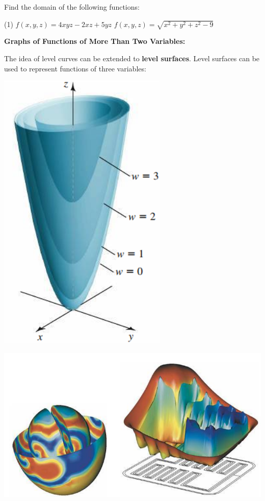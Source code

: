 \documentclass[../mathNotesPreamble]{subfiles}
\begin{document}
  \begin{ex*}
    Find the domain of the following functions:
  \end{ex*}
  \begin{tasks}[after-item-skip=\stretch{1}, label=](1)
    \task $f(x,y,z)=4xyz-2xz+5yz$
    \task $f(x,y,z)=\sqrt{x^2+y^2+z^2-9}$
  \end{tasks}
  \pagebreak

  \textbf{Graphs of Functions of More Than Two Variables:}

  The idea of level curves can be extended to \textbf{level surfaces}. Level surfaces can be used to represent functions of three variables:
  \begin{center}
    \includegraphics[width=0.25\linewidth]{../images/briggs_15_01/fig15_17}
  \end{center}

  \begin{center}
    \includegraphics[width=0.85\linewidth]{../images/briggs_15_01/fig15_18}
  \end{center}

  \pagebreak
  
\end{document}
